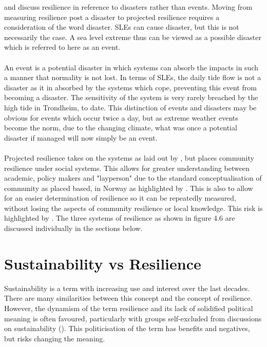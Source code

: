 \cite{cutter_place-based_2008} and \cite{cutter_community_2020} discuss resilience in reference to disasters rather than events. Moving from measuring resilience post a disaster to projected resilience requires a consideration of the word disaster. SLEs can cause disaster, but this is not necessarily the case. A sea level extreme thus can be viewed as a possible disaster which is referred to here as an event. 
\paragraph{}
An event is a potential disaster in which systems can absorb the impacts in such a manner that normality is not lost. In terms of SLEs, the daily tide flow is not a disaster as it in absorbed by the systems which cope, preventing this event from becoming a disaster. The sensitivity of the system is very rarely breached by the high tide in Trondheim, to date. This distinction of events and disasters may be obvious for events which occur twice a day, but as extreme weather events become the norm, due to the changing climate, what was once a potential disaster if managed will now simply be an event. 
\paragraph{}

Projected resilience takes on the systems as laid out by \cite{cutter_community_2020}, but places community resilience under social systems. This allows for greater understanding between academic, policy makers and "layperson" due to the standard conceptualisation of community as placed based, in Norway as highlighted by \cite{rasanen_conceptualizing_2020}. This is also to allow for an easier determination of resilience so it can be repeatedly measured, without losing the aspects of community resilience or local knowledge. This risk is highlighted by \cite{rasanen_conceptualizing_2020}. The three systems of resilience as shown in figure 4.6 are discussed individually in the sections below.



\section{Sustainability vs Resilience}

Sustainability is a term with increasing use and interest over the last decades. There are many similarities between this concept and the concept of resilience. However, the dynamism of the term resilience and its lack of solidified political meaning is often favoured, particularly with groups self-excluded from discussions on sustainability (\cite{moser_turbulent_2019}). This politicisation of the term has benefits and negatives, but risks changing the meaning.
